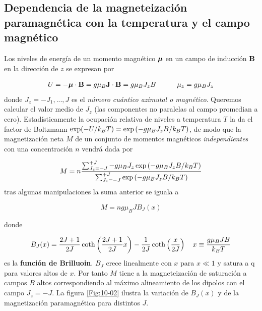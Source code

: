 \subsection[Dependencia de la magnetización respecto $\vec{\Bn}$ y $T$]{Dependencia de la magneteización paramagnética con la temperatura y el campo magnético}

Los niveles de energía de un momento magnético $\boldsymbol{\mu}$ en un campo de inducción $\mathbf{B}$ en la dirección de $z$ se expresan por 

\begin{equation}
	U = - \boldsymbol{\mu} \cdot \mathbf{B} = g \mu_B \mathbf{J} \cdot \mathbf{B} = g \mu_B J_z B \quad \quad \quad \mu_z = g \mu_B J_z
\end{equation}
donde $J_z = - J_1,...,J$ es el \textit{número cuántico azimutal o magnético}. Queremos calcular el valor medio de $J_z$ (las componentes no paralelas al campo promedian a cero). Estadísticamente la ocupación relativa de niveles a temperatura $T$ la da el factor de Boltzmann $\exp (-U/k_B T)=\exp \left( -g\mu_B J_z B / k_B T \right)$, de modo que la magnetización neta $M$ de un conjunto de momentos magnéticos \textit{independientes} con una concentración $n$ vendrá dada por 

\begin{equation}
	M = n \frac{\sum_{J_z=-J}^{+J} - g\mu_B J_z \exp \left( - g\mu_B J_z B / k_BT \right)}{\sum_{J_z=-J}^{+J} \exp \left( -g\mu_B J_z B / k_B T \right)} \label{Ec:10-03-06}
\end{equation}
tras algunas manipulaciones la suma anterior se iguala a 
\begin{mybox}
\begin{equation}
	M = n g \mu_B J B_J (x) \label{Ec:10-03-07}
\end{equation}
\end{mybox}
donde 

\begin{equation}
	B_J (x) = \frac{2J+1}{2J} \coth \left( \frac{2J+1}{2J}x \right) - \frac{1}{2J} \coth \left( \frac{x}{2J} \right) \quad x \equiv \frac{g\mu_B J B }{k_B T}
\end{equation}
es la \textbf{función de Brilluoin}. $B_J$ crece linealmente con $x$ para $x\ll 1$ y satura a q para valores altos de $x$. Por tanto $M$ tiene a la magneteización de saturación a campos $B$ altos correspondiendo al máximo alineamiento de los dipolos con el campo $J_z = -J$. La figura \ref{Fig:10-02} ilustra la variación de $B_J(x)$ y de la magnetización paramagnética para distintos $J$.

